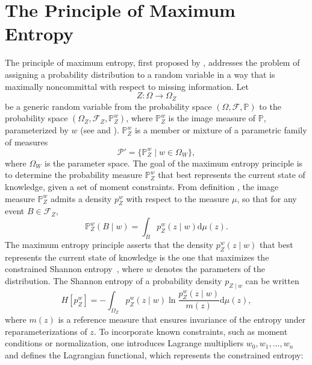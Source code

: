 \section{The Principle of Maximum Entropy}
\label{sec:maxent}
The principle of maximum entropy, first proposed by \citet{Jaynes1957}, addresses the problem of assigning a probability distribution to a random variable in a way that is maximally noncommittal with respect to missing information. Let
\begin{equation}
	Z\colon \Omega \to \Omega_Z
\end{equation}
be a generic random variable from the probability space $(\Omega, \mathcal{F}, \mathbb{P})$ to the probability space $(\Omega_Z,\mathcal{F}_Z, \mathbb{P}_{Z}^w)$, where $\mathbb{P}_{Z}^w$ is the image measure of $\mathbb{P}$, parameterized by $w$ (see  and ). $\mathbb{P}_{Z}^w$ is a member or mixture of a parametric family of measures
\begin{equation}
	\mathcal{P}' = \{ \mathbb{P}^w_{Z} \mid w \in \Omega_W\},
\end{equation}
where $\Omega_W$ is the parameter space. The goal of the maximum entropy principle is to determine the probability measure $\mathbb{P}_{Z}^w$ that best represents the current state of knowledge, given a set of moment constraints. From definition , the image measure $\mathbb{P}_{Z}^w$ admits a density $p_{Z}^w$ with respect to the measure $\mu$, so that for any event $B\in \mathcal{F}_Z$,
\begin{equation}
	\mathbb{P}_{Z}^w(B\mid w) = \int_B p_{Z}^w(z\mid w) \mathrm{d}\mu(z).
	\label{eq:max_ent_probability_measure}
\end{equation}
The maximum entropy principle asserts that the density $p_{Z}^w(z \mid w)$ that best represents the current state of knowledge is the one that maximizes the constrained Shannon entropy~\citep{Sivia2006}, where $w$ denotes the parameters of the distribution. The Shannon entropy of a probability density $p_{Z\mid w}$ can be written
\begin{equation}
	H[p^w_{Z}] = - \int_{\Omega_Z} p^w_{Z}(z \mid w) 
	\ln \frac{p_{Z}^w(z \mid w)}{m(z)}  \mathrm{d}\mu(z),
\end{equation}
where $m(z)$ is a reference measure that ensures invariance of the entropy under reparameterizations of $z$. To incorporate known constraints, such as moment conditions or normalization, one introduces Lagrange multipliers $w_0, w_1, \dots, w_n$ and defines the Lagrangian functional, which represents the constrained entropy:
